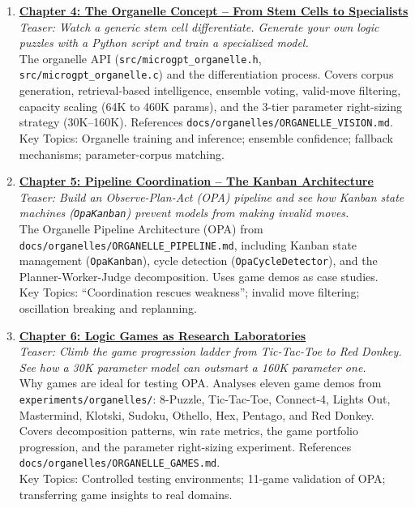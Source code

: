\documentclass[
]{article}
\begin{document}
\begin{enumerate}
\def\labelenumi{\arabic{enumi}.}
\setcounter{enumi}{3}
\item
  \textbf{\href{4.md}{Chapter 4: The Organelle Concept -- From Stem
  Cells to Specialists}}\\
  \emph{Teaser: Watch a generic stem cell differentiate. Generate your
  own logic puzzles with a Python script and train a specialized
  model.}\\
  The organelle API (\texttt{src/microgpt\_organelle.h},
  \texttt{src/microgpt\_organelle.c}) and the differentiation process.
  Covers corpus generation, retrieval-based intelligence, ensemble
  voting, valid-move filtering, capacity scaling (64K to 460K params),
  and the 3-tier parameter right-sizing strategy (30K--160K). References
  \texttt{docs/organelles/ORGANELLE\_VISION.md}.\\
  Key Topics: Organelle training and inference; ensemble confidence;
  fallback mechanisms; parameter-corpus matching.
\item
  \textbf{\href{5.md}{Chapter 5: Pipeline Coordination -- The Kanban
  Architecture}}\\
  \emph{Teaser: Build an Observe-Plan-Act (OPA) pipeline and see how
  Kanban state machines (\texttt{OpaKanban}) prevent models from making
  invalid moves.}\\
  The Organelle Pipeline Architecture (OPA) from
  \texttt{docs/organelles/ORGANELLE\_PIPELINE.md}, including Kanban
  state management (\texttt{OpaKanban}), cycle detection
  (\texttt{OpaCycleDetector}), and the Planner-Worker-Judge
  decomposition. Uses game demos as case studies.\\
  Key Topics: ``Coordination rescues weakness''; invalid move filtering;
  oscillation breaking and replanning.
\item
  \textbf{\href{6.md}{Chapter 6: Logic Games as Research
  Laboratories}}\\
  \emph{Teaser: Climb the game progression ladder from Tic-Tac-Toe to
  Red Donkey. See how a 30K parameter model can outsmart a 160K
  parameter one.}\\
  Why games are ideal for testing OPA. Analyses eleven game demos from
  \texttt{experiments/organelles/}: 8-Puzzle, Tic-Tac-Toe, Connect-4,
  Lights Out, Mastermind, Klotski, Sudoku, Othello, Hex, Pentago, and
  Red Donkey. Covers decomposition patterns, win rate metrics, the game
  portfolio progression, and the parameter right-sizing experiment.
  References \texttt{docs/organelles/ORGANELLE\_GAMES.md}.\\
  Key Topics: Controlled testing environments; 11-game validation of
  OPA; transferring game insights to real domains.
\end{enumerate}
\end{document}
